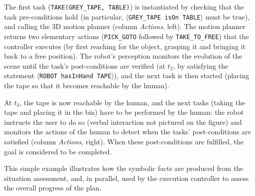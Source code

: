 \documentclass[preprint,3p,times]{elsarticle}
\newcommand{\concept}[1]{{\small \texttt{#1}}}
\newcommand{\stmt}[1]{{\footnotesize\tt$\langle$#1\relax$\rangle$}}
\begin{document}
The first task (\concept{TAKE(GREY\_TAPE, TABLE)}) is instantiated by checking
that the task pre-conditions hold (in particular, \stmt{GREY\_TAPE isOn TABLE}
must be true), and calling the 3D motion planner (column \emph{Actions},
left). The motion planner returns two elementary actions ({\tt PICK\_GOTO} followed
by {\tt TAKE\_TO\_FREE}) that the controller executes (by first reaching for
the object, grasping it and bringing it back to a free position).  The robot's
perception monitors the evolution of the scene until the task's post-conditions
are verified (at $t_2$, by satisfying the statement \stmt{ROBOT hasInHand
TAPE}), and the next task is then started (placing the tape so that it becomes
reachable by the human).

At $t_3$, the tape is now reachable by the human, and the next tasks (taking the
tape and placing it in the bin) have to be performed by the human: the robot
instructs the user to do so (verbal interaction not pictured on the figure) and
monitors the actions of the human to detect when the tasks' post-conditions are
satisfied (column \emph{Actions}, right). When these post-conditions are
fulfilled, the goal is considered to be completed.

This simple example illustrates how the symbolic facts are produced from the
situation assessment, and, in parallel, used by the execution controller to
assess the overall progress of the plan.
\end{document}

